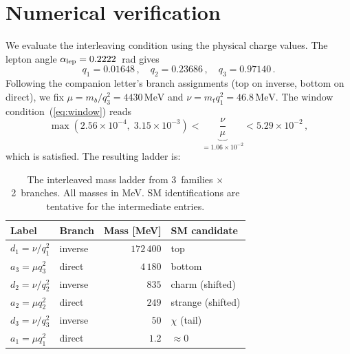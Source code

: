 \documentclass[preprint,12pt]{elsarticle}
\newcommand{\MeV}{\,\mathrm{MeV}}
\begin{document}
\section{Numerical verification}
\label{sec:numerics}

We evaluate the interleaving condition using the
physical charge values.
The lepton angle $\alpha_{\rm lep} = 0.2222$~rad
gives~\cite{letter_q2}
\begin{equation}
  q_1 = 0.01648\,,\quad
  q_2 = 0.23686\,,\quad
  q_3 = 0.97140\,.
  \label{eq:charges}
\end{equation}
Following the companion letter's branch assignments
(top on inverse, bottom on direct),
we fix $\mu = m_b/q_3^2 = 4430\MeV$ and
$\nu = m_t q_1^2 = 46.8\MeV$.  The window
condition~(\ref{eq:window}) reads
\begin{equation}
  \max(2.56 \times 10^{-4},\; 3.15 \times 10^{-3})
  < \underbrace{\frac{\nu}{\mu}}_{= 1.06 \times 10^{-2}}
  < 5.29 \times 10^{-2}\,,
\end{equation}
which is satisfied.  The resulting ladder is:

\begin{table}[h]
\centering
\caption{The interleaved mass ladder from 3~families $\times$ 2~branches.
  All masses in MeV.  SM identifications are tentative for the
  intermediate entries.}
\label{tab:ladder}
{\small
\begin{tabular}{llrl}
  \toprule
  Label & Branch & Mass [MeV] & SM candidate \\
  \midrule
  $d_1 = \nu/q_1^2$ & inverse & $172\,400$ & top \\
  $a_3 = \mu q_3^2$ & direct  & $4\,180$   & bottom \\
  $d_2 = \nu/q_2^2$ & inverse & $835$      & charm (shifted) \\
  $a_2 = \mu q_2^2$ & direct  & $249$      & strange (shifted) \\
  $d_3 = \nu/q_3^2$ & inverse & $50$       & $\chi$ (tail) \\
  $a_1 = \mu q_1^2$ & direct  & $1.2$      & $\approx 0$ \\
  \bottomrule
\end{tabular}}
\end{table}
\end{document}
